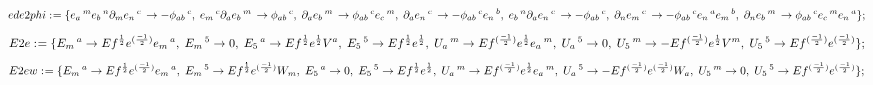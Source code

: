 \documentclass[11pt]{article}
\def\specialcolon{\mathrel{\mathop{:}}\hspace{-.5em}}
\begin{document}
\begin{dmath*}[compact, spread=2pt]
ede2phi\specialcolon{}= \{{e}_{a}\,^{m} {e}_{b}\,^{n} {\partial}_{m}{{e}_{n}\,^{c}}\,  \rightarrow -{\phi}_{a b}\,^{c},\; {e}_{m}\,^{c} {\partial}_{a}{{e}_{b}\,^{m}}\,  \rightarrow {\phi}_{a b}\,^{c},\; {\partial}_{a}{{e}_{b}\,^{m}}\,  \rightarrow {\phi}_{a b}\,^{c} {e}_{c}\,^{m},\; {\partial}_{a}{{e}_{n}\,^{c}}\,  \rightarrow -{\phi}_{a b}\,^{c} {e}_{n}\,^{b},\; {e}_{b}\,^{n} {\partial}_{a}{{e}_{n}\,^{c}}\,  \rightarrow -{\phi}_{a b}\,^{c},\; {\partial}_{n}{{e}_{m}\,^{c}}\,  \rightarrow -{\phi}_{a b}\,^{c} {e}_{n}\,^{a} {e}_{m}\,^{b},\; {\partial}_{n}{{e}_{b}\,^{m}}\,  \rightarrow {\phi}_{a b}\,^{c} {e}_{c}\,^{m} {e}_{n}\,^{a}\};
\end{dmath*}
\begin{dmath*}[compact, spread=2pt]
E2e\specialcolon{}= \{{E}_{m}\,^{a} \rightarrow Ef{}^{\frac{1}{2}} e{}^{(\frac{-1}{2})} {e}_{m}\,^{a},\; {E}_{m}\,^{5} \rightarrow 0,\; {E}_{5}\,^{a} \rightarrow Ef{}^{\frac{1}{2}} e{}^{\frac{1}{2}} {V}^{a},\; {E}_{5}\,^{5} \rightarrow Ef{}^{\frac{1}{2}} e{}^{\frac{1}{2}},\; {U}_{a}\,^{m} \rightarrow Ef{}^{(\frac{-1}{2})} e{}^{\frac{1}{2}} {e}_{a}\,^{m},\; {U}_{a}\,^{5} \rightarrow 0,\; {U}_{5}\,^{m} \rightarrow -Ef{}^{(\frac{-1}{2})} e{}^{\frac{1}{2}} {V}^{m},\; {U}_{5}\,^{5} \rightarrow Ef{}^{(\frac{-1}{2})} e{}^{(\frac{-1}{2})}\};
\end{dmath*}
\begin{dmath*}[compact, spread=2pt]
E2ew\specialcolon{}= \{{E}_{m}\,^{a} \rightarrow Ef{}^{\frac{1}{2}} e{}^{(\frac{-1}{2})} {e}_{m}\,^{a},\; {E}_{m}\,^{5} \rightarrow Ef{}^{\frac{1}{2}} e{}^{(\frac{-1}{2})} {W}_{m},\; {E}_{5}\,^{a} \rightarrow 0,\; {E}_{5}\,^{5} \rightarrow Ef{}^{\frac{1}{2}} e{}^{\frac{1}{2}},\; {U}_{a}\,^{m} \rightarrow Ef{}^{(\frac{-1}{2})} e{}^{\frac{1}{2}} {e}_{a}\,^{m},\; {U}_{a}\,^{5} \rightarrow -Ef{}^{(\frac{-1}{2})} e{}^{(\frac{-1}{2})} {W}_{a},\; {U}_{5}\,^{m} \rightarrow 0,\; {U}_{5}\,^{5} \rightarrow Ef{}^{(\frac{-1}{2})} e{}^{(\frac{-1}{2})}\};
\end{dmath*}
\end{document}
